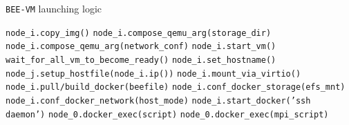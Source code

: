 \begin{algorithm}
\caption{\texttt{BEE-VM} launching logic}
\label{bee-launch}
\begin{algorithmic}[1]

	\STATE \texttt{node\_i.copy\_img()}
	\STATE \texttt{node\_i.compose\_qemu\_arg(storage\_dir)}
	\STATE \texttt{node\_i.compose\_qemu\_arg(network\_conf)}
    \STATE \texttt{node\_i.start\_vm()}
\ENDFOR
\STATE \texttt{wait\_for\_all\_vm\_to\_become\_ready()}
\STATE \texttt{node\_i.set\_hostname()}
\STATE \texttt{node\_j.setup\_hostfile(node\_i.ip())}
\ENDFOR
\ENDFOR
{}
\STATE \texttt{node\_i.mount\_via\_virtio()}
\ENDFOR
{}
\STATE \texttt{node\_i.pull/build\_docker(beefile)}
\STATE 
\texttt{node\_i.conf\_docker\_storage(efs\_mnt)}
\STATE \texttt{node\_i.conf\_docker\_network(host\_mode)}
\STATE \texttt{node\_i.start\_docker('ssh daemon')}
\ENDFOR
{}
\STATE \texttt{node\_0.docker\_exec(script)}
\ENDFOR
{}
\STATE \texttt{node\_0.docker\_exec(mpi\_script)}
\ENDFOR

\end{algorithmic}
\end{algorithm}
